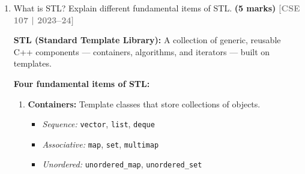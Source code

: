 \documentclass[12pt,a3paper]{article}
\newcommand{\yr}[1]{\hfill\textcolor{gray}{\small\textbf{[#1]}}}
\newcommand{\mk}[1]{\textcolor{orange!70!black}{\small\textbf{(#1 marks)}}}
\begin{document}
\begin{enumerate}
\begin{tcolorbox}
\begin{lstlisting}[language=C++]
    T getob() { return ob; }
};

// 2D generic class inheriting Gen
template <class T1, class T2>
class Gen2D : public Gen<T2> {
    T1 ob2D;
public:
    // Passes n and o2 to the base Gen<T2> constructor
    Gen2D(int n, T1 o1, T2 o2) : Gen<T2>(n, o2), ob2D(o1) {}
    
    // Overriding show to just print the T2 object
    void show() { 
        // Using this-> to access dependent base class members in C++
        cout << "Gen2D: " << this->getob() << "\n"; 
    }
    
    // Note: getob() is inherited from Gen<T2>, so ob2.getob() 
    // will naturally return the T2 (char *) object without needing 
    // to be rewritten or shadowed here.
};

int main() {
    NonGen ob(10);
    Gen<char> ob1(20, 'A');
    
    // Note: Older C++ allowed string literals to char*, 
    // modern compilers may warn about this deprecation.
    Gen2D<double, char*> ob2(40, 60.5, (char*)"Gen2Object"); 
    
    ob.show();  
    ob1.show();  
    ob2.show();
    
    cout << ob1.getob() << "\n"; 
    cout << ob2.getob() << "\n"; 
    
    return 0;
}
\end{lstlisting}

\end{tcolorbox}

\item What is STL? Explain different fundamental items of STL. \mk{5}
\yr{CSE 107 | 2023--24}

\begin{tcolorbox}[enhanced,breakable,ansbox,colback=cH!4,colframe=cH,
  boxrule=0.8pt,arc=5pt,
  title={\textbf{Answer --- What is STL? Fundamental items.}},
  fonttitle=\bfseries\color{white},colbacktitle=cH]

\textbf{STL (Standard Template Library):}
A collection of generic, reusable C++ components --- containers,
algorithms, and iterators --- built on templates.

\textbf{Four fundamental items of STL:}

\begin{enumerate}[label=\textbf{\arabic*.}]
  \item \textbf{Containers:} Template classes that store collections
    of objects.
    \begin{itemize}[itemsep=1pt]
      \item \emph{Sequence:} \texttt{vector}, \texttt{list},
        \texttt{deque}
      \item \emph{Associative:} \texttt{map}, \texttt{set},
        \texttt{multimap}
      \item \emph{Unordered:} \texttt{unordered\_map},
        \texttt{unordered\_set}
    \end{itemize}


\end{enumerate}
\end{tcolorbox}
\end{enumerate}
\end{document}
